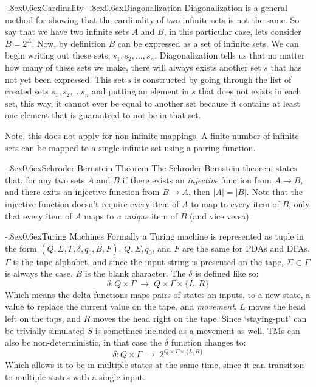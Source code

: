 \documentclass[10pt,landscape]{article}
\makeatletter
\renewcommand{\section}{\@startsection{section}{1}{0pt}%
                        {-.8ex}{0.6ex}{\normalfont\large\bfseries}}
\renewcommand{\subsection}{\@startsection{subsection}{2}{0pt}%
                           {-.8ex}{0.6ex}{\normalfont\normalsize\bfseries}}
\newcommand{\spto}{\;\to\;}
\makeatother
\begin{document}
\begin{multicols*}{3}
\section{Cardinality}
\subsection{Diagonalization}
Diagonalization is a general method for showing that the cardinality of
two infinite sets is not the same. So say that we have two infinite sets $A$ and $B$,
in this particular case, lets consider $B = 2^A$. Now, by definition $B$ can
be expressed as a set of infinite sets. We can begin writing out these sets,
$s_1, s_2, \ldots, s_n$. Diagonalization tells us that no matter how many
of these sets we make, there will always exists another set $s$ that has not yet
been expressed. This set $s$ is constructed by going through the list of created
sets $s_1, s_2, \ldots s_n$ and putting an element in $s$ that does not exists in
each set, this way, it cannot ever be equal to another set because it
contains at least one element that is guaranteed to not be in that set.

Note, this does not apply for non-infinite mappings. A finite number of infinite
sets can be mapped to a single infinite set using a pairing function.

\subsection{Schr\"{o}der-Bernstein Theorem}
The Schr\"{o}der-Bernstein theorem states that, for any two sets $A$ and $B$
if there exists an \textit{injective} function from $A \to B$, and
there exits an injective function from $B \to A$, then $|A| = |B|$.
Note that the injective function doesn't require every item of $A$ to map
to every item of $B$, only that every item of $A$ maps to \textit{a unique} item
of $B$ (and vice versa).

\section{Turing Machines}
Formally a Turing machine is represented as tuple in the form 
$(Q, \Sigma, \Gamma, \delta, q_0, B, F)$. $Q, \Sigma, q_0$, and $F$ are the same
for PDAs and DFAs. $\Gamma$ is the tape alphabet, and since the input string
is presented on the tape, $\Sigma \subset \Gamma$ is always the case. $B$ is
the blank character. The $\delta$ is defined like so:
\[
    \delta : Q \times \Gamma \spto Q \times \Gamma \times \{L, R\}
\]
Which means the delta functions maps pairs of states an inputs, to a new state,
a value to replace the current value on the tape, and \textit{movement}. $L$ moves
the head left on the taps, and $R$ moves the head right on the tape. Since `staying-put'
can be trivially simulated $S$ is sometimes included as a movement as well. TMs
can also be non-deterministic, in that case the $\delta$ function changes to:
\[
    \delta : Q \times \Gamma \spto 2^{Q \times \Gamma \times \{L, R\}}
\]
Which allows it to be in multiple states at the same time, since it can transition
to multiple states with a single input.


\end{multicols*}
\end{document}
